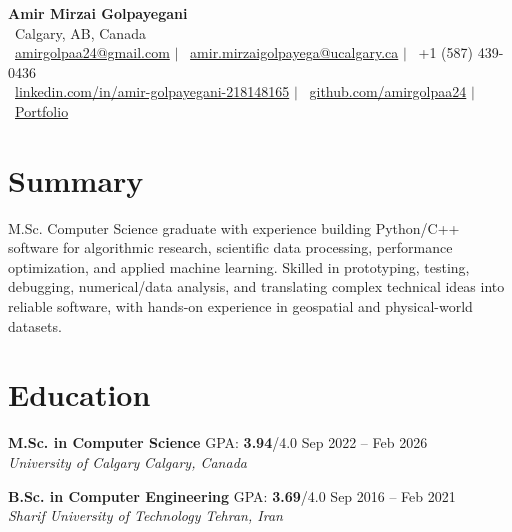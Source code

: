 \documentclass[a4paper,10pt]{article}
\newcommand{\resumeEducationSubheading}[5]{
    \textbf{#1} \hfill #2 \hfill #3 \\
    \textit{#4} \hfill \textit{#5}
}
\begin{document}

\begin{center}
    {\LARGE \textbf{Amir Mirzai Golpayegani}} \\[0.25em]
    \faMapMarker*~Calgary, AB, Canada \\[0.25em]
    \faEnvelope~\href{mailto:amirgolpaa24@gmail.com}{amirgolpaa24@gmail.com}
    $|$
    \faEnvelope~\href{mailto:amir.mirzaigolpayega@ucalgary.ca}{amir.mirzaigolpayega@ucalgary.ca}
    $|$
    \faPhone*~+1 (587) 439-0436 \\[0.25em]
    \faLinkedin~\href{https://linkedin.com/in/amir-golpayegani-218148165}{linkedin.com/in/amir-golpayegani-218148165}
    $|$
    \faGithub~\href{https://github.com/amirgolpaa24}{github.com/amirgolpaa24}
    $|$
    \faGlobe~\href{https://amir-portfolio-navy.vercel.app/}{Portfolio}
\end{center}


\section*{Summary}

M.Sc. Computer Science graduate with experience building Python/C++ software for algorithmic research, scientific data processing, performance optimization, and applied machine learning. Skilled in prototyping, testing, debugging, numerical/data analysis, and translating complex technical ideas into reliable software, with hands-on experience in geospatial and physical-world datasets.


\section*{Education}

\resumeEducationSubheading
{M.Sc. in Computer Science}
{GPA: \textbf{3.94}/4.0}
{Sep 2022 -- Feb 2026}
{University of Calgary}
{Calgary, Canada}

\vspace{0.35em}

\resumeEducationSubheading
{B.Sc. in Computer Engineering}
{GPA: \textbf{3.69}/4.0}
{Sep 2016 -- Feb 2021}
{Sharif University of Technology}
{Tehran, Iran}

\end{document}
